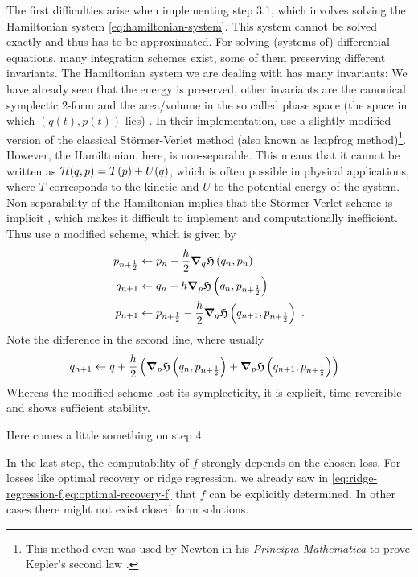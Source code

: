 The first difficulties arise when implementing step 3.1, which involves solving the Hamiltonian system \ref{eq:hamiltonian-system}.
This system cannot be solved exactly and thus has to be approximated.
For solving (systems of) differential equations, many integration schemes exist, some of them preserving different invariants.
The Hamiltonian system we are dealing with has many invariants:
We have already seen that the energy is preserved, other invariants are the canonical symplectic 2-form \cite{marsden10} and the area/volume in the so called phase space (the space in which $(q(t), p(t))$ lies) \cite{hairer06}.
In their implementation, \citet{owhadi20} use a slightly modified version of the classical Störmer-Verlet method (also known as leapfrog method)\footnote{This method even was used by Newton in his \emph{Principia Mathematica} to prove Kepler's second law \cite{hairer03}.}.
However, the Hamiltonian, here, is non-separable.
This means that it cannot be written as $\mathcal{H}(q, p) = T(p) + U(q)$, which is often possible in physical applications, where $T$ corresponds to the kinetic and $U$ to the potential energy of the system.
Non-separability of the Hamiltonian implies that the Störmer-Verlet scheme is implicit \cite{hairer06}, which makes it difficult to implement and computationally inefficient.
Thus \citet{owhadi20} use a modified scheme, which is given by
\begin{align}
	p_{n+\frac{1}{2}} &\gets p_n - \frac{h}{2} \grad_q\mathfrak{H}\left(q_n, p_n\right) \label{eq:leapfrog-p.5}\\
	q_{n+1} &\gets q_n + h \grad_p\mathfrak{H}\left(q_n, p_{n+\frac{1}{2}}\right)\\
	p_{n+1} &\gets p_{n+\frac{1}{2}} - \frac{h}{2} \grad_q\mathfrak{H}\left(q_{n+1}, p_{n+\frac{1}{2}}\right) \label{eq:leapfrog-p1}\ .
\end{align}
Note the difference in the second line, where usually 
\begin{equation}
q_{n+1} \gets q + \frac{h}{2} \left(\grad_p\mathfrak{H}\left(q_n, p_{n+\frac{1}{2}}\right) + \grad_p\mathfrak{H}\left(q_{n+1}, p_{n+\frac{1}{2}}\right)\right) \ .
\end{equation}
Whereas the modified scheme lost its symplecticity, it is explicit, time-reversible and shows sufficient stability.

Here comes a little something on step 4.

In the last step, the computability of $f$ strongly depends on the chosen loss.
For losses like optimal recovery or ridge regression, we already saw in \cref{eq:ridge-regression-f,eq:optimal-recovery-f} that $f$ can be explicitly determined.
In other cases there might not exist closed form solutions.

